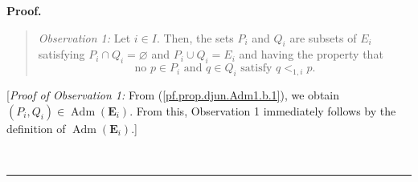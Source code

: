 \documentclass[numbers=enddot,12pt,final,onecolumn,notitlepage,abstracton]{scrartcl}
\theoremstyle{definition}
\newenvironment{statement}{\begin{quote}}{\end{quote}}
\newenvironment{proof}[1][Proof]{\noindent\textbf{#1.} }{\ \rule{0.5em}{0.5em}}
\newenvironment{verlong}{}{}
\begin{document}
\begin{verlong}
\begin{footnotesize}
\begin{proof}
\begin{statement}
\textit{Observation 1:} Let $i\in I$. Then, the sets $P_{i}$ and $Q_{i}$ are
subsets of $E_{i}$ satisfying $P_{i}\cap Q_{i}=\varnothing$ and $P_{i}\cup
Q_{i}=E_{i}$ and having the property that
\begin{equation}
\text{no }p\in P_{i}\text{ and }q\in Q_{i}\text{ satisfy }q<_{1,i}p.
\label{pf.prop.djun.Adm1.b.2}%
\end{equation}

\end{statement}

[\textit{Proof of Observation 1:} From (\ref{pf.prop.djun.Adm1.b.1}), we
obtain $\left(  P_{i},Q_{i}\right)  \in\operatorname*{Adm}\left(
\mathbf{E}_{i}\right)  $. From this, Observation 1 immediately follows by the
definition of $\operatorname*{Adm}\left(  \mathbf{E}_{i}\right)  $.]


\end{proof}
\end{footnotesize}
\end{verlong}
\end{document}
